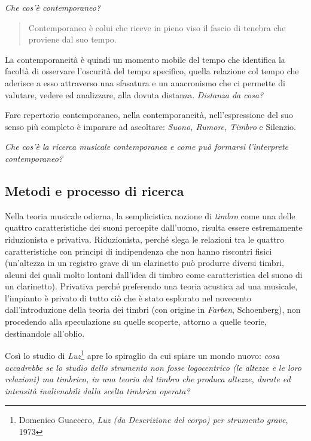 \documentclass{gs-adonis}
\begin{document}
\emph{Che cos'è contemporaneo?}

\begin{quote}
  Contemporaneo è colui che riceve in pieno viso il fascio di tenebra che
  proviene dal suo tempo. \cite{agamben2008che}
\end{quote}

La contemporaneità è quindi un momento mobile del tempo che identifica la
facoltà di osservare l’oscurità del tempo specifico, quella relazione col
tempo che aderisce a esso attraverso una sfasatura e un anacronismo che ci
permette di valutare, vedere ed analizzare, alla dovuta distanza.
\emph{Distanza da cosa?}

Fare repertorio contemporaneo, nella contemporaneità, nell’espressione del suo
senso più completo è imparare ad ascoltare: \emph{Suono, Rumore, Timbro} e Silenzio.

\emph{Che cos'è la ricerca musicale contemporanea e come può formarsi l'interprete contemporaneo?}
\subsection{Metodi e processo di ricerca}%

Nella teoria musicale odierna, la semplicistica nozione di \emph{timbro} come
una delle quattro caratteristiche dei suoni percepite dall'uomo, risulta essere
estremamente riduzionista e privativa. Riduzionista, perché slega le relazioni
tra le quattro caratteristiche con principi di indipendenza che non hanno
riscontri fisici (un'altezza in un registro grave di un clarinetto può produrre
diversi timbri, alcuni dei quali molto lontani dall'idea di timbro come
caratteristica del suono di un clarinetto). Privativa perché preferendo una
teoria acustica ad una musicale, l'impianto è privato di tutto ciò che è stato
esplorato nel novecento dall'introduzione della teoria dei timbri (con origine
in \emph{Farben}, Schoenberg), non procedendo alla speculazione su quelle
scoperte, attorno a quelle teorie, destinandole all'oblio.

Così lo studio di \emph{Luz}\footnote{%
Domenico Guaccero, \emph{Luz (da Descrizione del corpo) per strumento grave}, 1973
} apre lo spiraglio da cui spiare un mondo nuovo: \emph{cosa accadrebbe se lo
studio dello strumento non fosse logocentrico (le altezze e le loro relazioni)
ma timbrico, in una teoria del timbro che produca altezze, durate ed intensità
inalienabili dalla scelta timbrica operata?}
\end{document}
